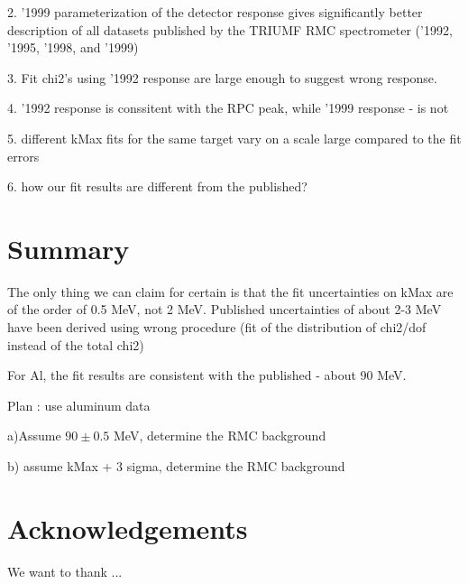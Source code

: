 \documentclass[12pt]{article}
\begin{document}
2. '1999 parameterization of the detector response gives significantly better
    description of all datasets published by the TRIUMF RMC spectrometer
    ('1992, '1995, '1998, and '1999)

    3. Fit chi2's using '1992 response are large enough to suggest wrong response.

    4. '1992 response is conssitent with the RPC peak, while '1999 response - is not

    5. different kMax fits for the same target vary on a scale large compared to the
    fit errors

    6. how our fit results are different from the published? 


\section{ Summary }


The only thing we can claim for certain is that the fit uncertainties on kMax are
of the order of 0.5 MeV, not 2 MeV. Published uncertainties of about 2-3 MeV
have been derived using wrong procedure (fit of the distribution of chi2/dof
instead of the total chi2)


For Al, the fit results are consistent with the published - about 90 MeV.


Plan : use aluminum data

a)Assume $90 \pm 0.5$ MeV, determine the RMC background

b) assume kMax + 3 sigma, determine the RMC background

\section{ Acknowledgements }

We want to thank ...




\end{document}
